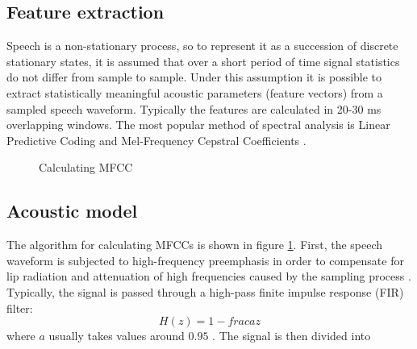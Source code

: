 \subsection{Feature extraction}
Speech is a non-stationary process, so to represent it as a succession of discrete stationary states, it is assumed that over a short period of time signal statistics do not differ from sample to sample. Under this assumption it is possible to extract statistically meaningful acoustic parameters (feature vectors) from a sampled speech waveform. Typically the features are calculated in 20-30 ms overlapping windows. The most popular method of spectral analysis is Linear Predictive Coding  and Mel-Frequency Cepstral Coefficients . 
\begin{figure}[!ht]
  \label{figure:mfcc}
  \centering
  \caption{Calculating MFCC}
\end{figure}
\subsection{Acoustic model}
The algorithm for calculating MFCCs is shown in figure \ref{figure:mfcc}. First, the speech waveform is subjected to high-frequency preemphasis in order to compensate for lip radiation and attenuation of high frequencies caused by the sampling process \cite{bhupinder2012preprocessing}. Typically, the signal is passed through a high-pass finite impulse response (FIR)  filter:
\begin{equation}
H(z)=1-frac{a}{z}
\end{equation}
where $a$ usually takes values around $0.95$ \cite{nossair1995signal}. The signal is then divided into 

